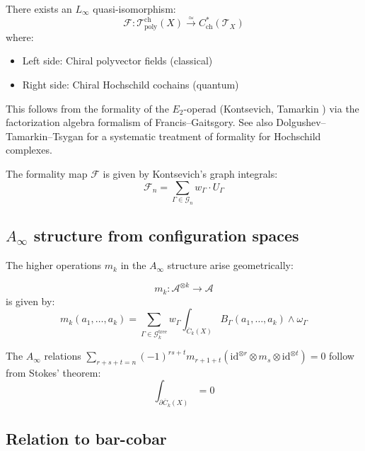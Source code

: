 \begin{theorem}\label{thm:chiral-formality}
There exists an $L_\infty$ quasi-isomorphism:
\[\mathcal{F}: \mathcal{T}_{\text{poly}}^{\text{ch}}(X) \xrightarrow{\simeq} C^*_{\text{ch}}(\mathcal{T}_X)\]
where:
\begin{itemize}
\item Left side: Chiral polyvector fields (classical)
\item Right side: Chiral Hochschild cochains (quantum)
\end{itemize}
This follows from the formality of the $E_2$-operad (Kontsevich, Tamarkin \cite{Tamarkin00}) via the factorization algebra formalism of Francis--Gaitsgory.  See also Dolgushev--Tamarkin--Tsygan \cite{DTT09} for a systematic treatment of formality for Hochschild complexes.
\end{theorem}

The formality map $\mathcal{F}$ is given by Kontsevich's graph integrals:
\[\mathcal{F}_n = \sum_{\Gamma \in \mathcal{G}_n} w_\Gamma \cdot U_\Gamma\]

\subsection{\texorpdfstring{$A_\infty$ structure from configuration spaces}{A- structure from configuration spaces}}

The higher operations $m_k$ in the $A_\infty$ structure arise geometrically:

\begin{proposition}
\label{prop:ainfty-operations-config}
\[m_k: \mathcal{A}^{\otimes k} \to \mathcal{A}\]
is given by:
\[m_k(a_1, \ldots, a_k) = \sum_{\Gamma \in \mathcal{G}_k^{\text{tree}}} w_\Gamma \int_{\overline{C}_k(X)} B_\Gamma(a_1, \ldots, a_k) \wedge \omega_\Gamma\]
\end{proposition}

The $A_\infty$ relations $\sum_{r+s+t=n} (-1)^{rs+t} m_{r+1+t}(\mathrm{id}^{\otimes r} \otimes m_s \otimes \mathrm{id}^{\otimes t}) = 0$ follow from Stokes' theorem:
\[\int_{\partial \overline{C}_k(X)} = 0\]

\subsection{Relation to bar-cobar}

